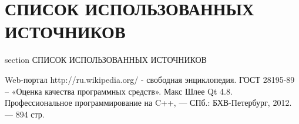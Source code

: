 \newpage
\section*{СПИСОК ИСПОЛЬЗОВАННЫХ ИСТОЧНИКОВ}
 {section} {СПИСОК ИСПОЛЬЗОВАННЫХ ИСТОЧНИКОВ}

\begin{thebibliography}{99}
   Web-портал http://ru.wikipedia.org/ - свободная энциклопедия.
   ГОСТ 28195-89 – «Оценка качества программных средств».
   Макс Шлее Qt 4.8. Профессиональное программирование на C++, — СПб.: БХВ-Петербург, 2012. — 894 стр.
\end{thebibliography}
